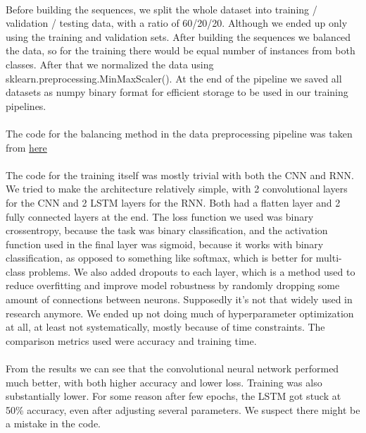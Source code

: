 \documentclass{article}
\begin{document}
  \paragraph{}
  Before building the sequences, we split the whole dataset into training / validation / testing data, with a ratio of 60/20/20. Although we ended up only using the training and validation sets. After building the sequences we balanced the data, so for the training there would be equal number of instances from both classes. After that we normalized the data using sklearn.preprocessing.MinMaxScaler(). At the end of the pipeline we saved all datasets as numpy binary format for efficient storage to be used in our training pipelines.
  \paragraph{}
  The code for the balancing method in the data preprocessing pipeline was taken from \href{https://pythonprogramming.net/balancing-rnn-data-deep-learning-python-tensorflow-keras/}{here}
  \paragraph{}
  The code for the training itself was mostly trivial with both the CNN and RNN. We tried to make the architecture relatively simple, with 2 convolutional layers for the CNN and 2 LSTM layers for the RNN. Both had a flatten layer and 2 fully connected layers at the end. The loss function we used was binary crossentropy, because the task was binary classification, and the activation function used in the final layer was sigmoid, because it works with binary classification, as opposed to something like softmax, which is better for multi-class problems. We also added dropouts to each layer, which is a method used to reduce overfitting and improve model robustness by randomly dropping some amount of connections between neurons. Supposedly it’s not that widely used in research anymore.
  We ended up not doing much of hyperparameter optimization at all, at least not systematically, mostly because of time constraints. The comparison metrics used were accuracy and training time.
  \paragraph{}
  From the results we can see that the convolutional neural network performed much better, with both higher accuracy and lower loss. Training was also substantially lower. For some reason after few epochs, the LSTM got stuck at 50\% accuracy, even after adjusting several parameters. We suspect there might be a mistake in the code.
\end{document}
